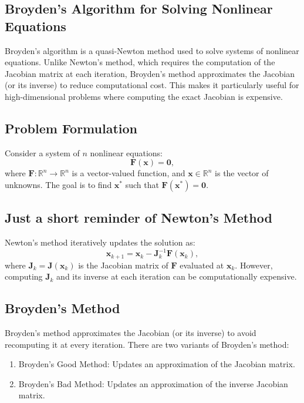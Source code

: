\documentclass[%
oneside,                 %
final,                   %
10pt]{article}
\begin{document}
\subsection{Broyden’s Algorithm for Solving Nonlinear Equations}

Broyden’s algorithm is a quasi-Newton method used to solve systems of
nonlinear equations. Unlike Newton’s method, which requires the
computation of the Jacobian matrix at each iteration, Broyden’s method
approximates the Jacobian (or its inverse) to reduce computational
cost. This makes it particularly useful for high-dimensional problems
where computing the exact Jacobian is expensive.

\subsection{Problem Formulation}

Consider a system of \( n \) nonlinear equations:
\[
\mathbf{F}(\mathbf{x}) = \mathbf{0},
\]
where \( \mathbf{F}: \mathbb{R}^n \to \mathbb{R}^n \) is a vector-valued function, and \( \mathbf{x} \in \mathbb{R}^n \) is the vector of unknowns. The goal is to find \( \mathbf{x}^* \) such that \( \mathbf{F}(\mathbf{x}^*) = \mathbf{0} \).

\subsection{Just a short reminder of Newton’s Method}

Newton’s method iteratively updates the solution as:
\[
\mathbf{x}_{k+1} = \mathbf{x}_k - \mathbf{J}_k^{-1} \mathbf{F}(\mathbf{x}_k),
\]
where \( \mathbf{J}_k = \mathbf{J}(\mathbf{x}_k) \) is the Jacobian matrix of \( \mathbf{F} \) evaluated at \( \mathbf{x}_k \). However, computing \( \mathbf{J}_k \) and its inverse at each iteration can be computationally expensive.

\subsection{Broyden’s Method}

Broyden’s method approximates the Jacobian (or its inverse) to avoid recomputing it at every iteration. There are two variants of Broyden’s method:
\begin{enumerate}
\item Broyden’s Good Method: Updates an approximation of the Jacobian matrix.

\item Broyden’s Bad Method: Updates an approximation of the inverse Jacobian matrix.
\end{enumerate}
\end{document}
